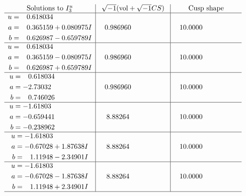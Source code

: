 \documentclass[1p]{elsarticle_modified}
\theoremstyle{definition}
\newcommand{\I}{\sqrt{-1}}
\begin{document}
$$\begin{array}{c|c|c}  
\text{Solutions to }I^u_{3}& \I (\text{vol} + \sqrt{-1}CS) & \text{Cusp shape}\\
 \hline 
\begin{aligned}
u &= \phantom{-}0.618034\phantom{ +0.000000I} \\
a &= \phantom{-}0.365159 + 0.080975 I \\
b &= \phantom{-}0.626987 - 0.659789 I\end{aligned}
 & \phantom{-}0.986960\phantom{ +0.000000I} & \phantom{-}10.0000\phantom{ +0.000000I} \\ \hline\begin{aligned}
u &= \phantom{-}0.618034\phantom{ +0.000000I} \\
a &= \phantom{-}0.365159 - 0.080975 I \\
b &= \phantom{-}0.626987 + 0.659789 I\end{aligned}
 & \phantom{-}0.986960\phantom{ +0.000000I} & \phantom{-}10.0000\phantom{ +0.000000I} \\ \hline\begin{aligned}
u &= \phantom{-}0.618034\phantom{ +0.000000I} \\
a &= -2.73032\phantom{ +0.000000I} \\
b &= \phantom{-}0.746026\phantom{ +0.000000I}\end{aligned}
 & \phantom{-}0.986960\phantom{ +0.000000I} & \phantom{-}10.0000\phantom{ +0.000000I} \\ \hline\begin{aligned}
u &= -1.61803\phantom{ +0.000000I} \\
a &= -0.659441\phantom{ +0.000000I} \\
b &= -0.238962\phantom{ +0.000000I}\end{aligned}
 & \phantom{-}8.88264\phantom{ +0.000000I} & \phantom{-}10.0000\phantom{ +0.000000I} \\ \hline\begin{aligned}
u &= -1.61803\phantom{ +0.000000I} \\
a &= -0.67028 + 1.87638 I \\
b &= \phantom{-}1.11948 - 2.34901 I\end{aligned}
 & \phantom{-}8.88264\phantom{ +0.000000I} & \phantom{-}10.0000\phantom{ +0.000000I} \\ \hline\begin{aligned}
u &= -1.61803\phantom{ +0.000000I} \\
a &= -0.67028 - 1.87638 I \\
b &= \phantom{-}1.11948 + 2.34901 I\end{aligned}
 & \phantom{-}8.88264\phantom{ +0.000000I} & \phantom{-}10.0000\phantom{ +0.000000I}\\
 \hline 
 \end{array}$$\newpage\newpage\renewcommand{\arraystretch}{1}
\end{document}
